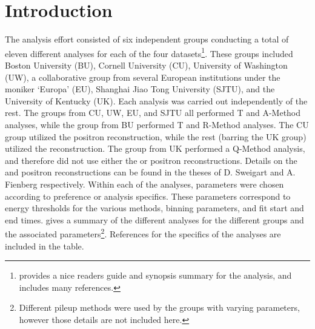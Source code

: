 
\graphicspath{{Body/Figures/}}

\clearpage
\section{Introduction}


The \Rone \wa analysis effort consisted of six independent groups conducting a total of eleven different analyses for each of the four \Rone datasets\footnote{ provides a nice readers guide and synopsis summary for the \Rone analysis, and includes many references.}. These groups included Boston University (BU), Cornell University (CU), University of Washington (UW), a collaborative group from several European institutions under the moniker `Europa' (EU), Shanghai Jiao Tong University (SJTU), and the University of Kentucky (UK). Each analysis was carried out independently of the rest. The groups from CU, UW, EU, and SJTU all performed T and A-Method analyses, while the group from BU performed T and R-Method analyses. The CU group utilized the \RE positron reconstruction, while the rest (barring the UK group) utilized the \RW reconstruction. The group from UK performed a Q-Method analysis, and therefore did not use either the \RE or \RW positron reconstructions. Details on the \RE and \RW positron reconstructions can be found in the theses of D. Sweigart \cite{phdthesis:2020Sweigart} and A. Fienberg \cite{phdthesis:2019Fienberg} respectively. Within each of the analyses, parameters were chosen according to preference or analysis specifics. These parameters correspond to energy thresholds for the various methods, binning parameters, and fit start and end times.  gives a summary of the different analyses for the different groups and the associated parameters\footnote{Different pileup methods were used by the groups with varying parameters, however those details are not included here.}. References for the specifics of the analyses are included in the table. 


